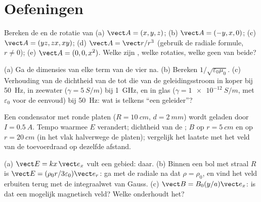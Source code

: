 \section{Oefeningen}

\begin{exercise}[$\star$]\label{exo:b2:maxwell-equations:1}
Bereken de  en de rotatie van (a) $\vect A = (x, y, z)$; (b)
$\vect A = (-y, x, 0)$; (c) $\vect A = (yz, zx, xy)$; (d)
$\vect A = \vect r/r^3$ (gebruik de radiale formule, $r \ne 0$); (e)
$\vect A = (0, 0, x^2)$. Welke zijn , welke rotaties, welke geen
van beide?
\end{exercise}

\begin{exercise}[$\star$]\label{exo:b2:maxwell-equations:2}
(a) Ga de dimensies van elke term van de vier  na.
(b) Bereken $1/\sqrt{\varepsilon_0\mu_0}$. (c) Verhouding van de dichtheid
van de  tot die van de geleidingsstroom in koper bij
\qty{50}{Hz}, in zeewater ($\gamma = \qty{5}{S/m}$) bij \qty{1}{GHz}, en in
glas ($\gamma =
\qty{1e-12}{S/m}$, met $\varepsilon_0$ voor de eenvoud) bij
\qty{50}{Hz}: wat is telkens ``een geleider''?
\end{exercise}

\begin{exercise}[$\star$]\label{exo:b2:maxwell-equations:3}
Een condensator met ronde platen ($R = \qty{10}{cm}$, $d = \qty{2}{mm}$)
wordt geladen door $I = \qty{0.5}{A}$. Tempo waarmee $E$ verandert;
dichtheid van de ; $B$ op $r = \qty{5}{cm}$ en op
$r = \qty{20}{cm}$ (in het vlak halverwege de platen); vergelijk het laatste
met het veld van de toevoerdraad op dezelfde afstand.
\end{exercise}

\begin{exercise}[$\star$]\label{exo:b2:maxwell-equations:4}
(a) $\vect E = kx\,\vect e_x$ vult een gebied:  daar. (b)
Binnen een bol met straal $R$ is
$\vect E = (\rho_0r/3\varepsilon_0)\vect e_r$: ga met de radiale 
na dat $\rho = \rho_0$, en vind het veld erbuiten terug met de integraalwet
van Gauss. (c) $\vect B = B_0(y/a)\vect e_x$: is dat een mogelijk magnetisch
veld? Welke  onderhoudt het?
\end{exercise}

